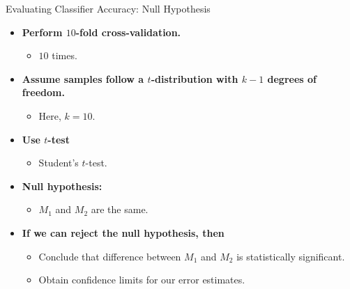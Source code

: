\begin{frame}{Evaluating Classifier Accuracy: Null Hypothesis}
  \begin{itemize}
  \item \textbf{Perform $10$-fold cross-validation.}
    \begin{itemize}
    \item $10$ times.
    \end{itemize}
  \item \textbf{Assume samples follow a $t$-distribution with $k-1$ degrees of freedom.}
    \begin{itemize}
    \item Here, $k = 10$.
    \end{itemize}
  \item \textbf{Use $t$-test}
    \begin{itemize}
    \item Student's $t$-test.
    \end{itemize}
  \item \textbf{Null hypothesis:}
    \begin{itemize}
    \item $M_1$ and $M_2$ are the same.
    \end{itemize}
  \item \textbf{If we can reject the null hypothesis, then}
    \begin{itemize}
    \item Conclude that difference between $M_1$ and $M_2$ is statistically significant.
    \item Obtain confidence limits for our error estimates.
    \end{itemize}
  \end{itemize}
\end{frame}

